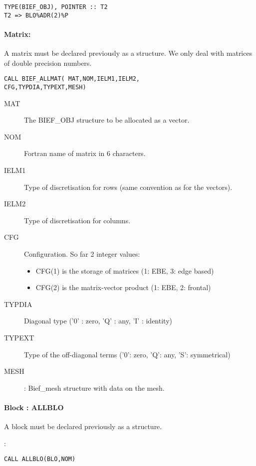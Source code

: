 \begin{lstlisting}[language=TelFortran]
TYPE(BIEF_OBJ), POINTER :: T2
T2 => BLO%ADR(2)%P
\end{lstlisting}

\paragraph{Matrix: }

A matrix must be declared previously as a  structure. We only
deal with matrices of double precision numbers.

\begin{lstlisting}[language=TelFortran]
CALL BIEF_ALLMAT( MAT,NOM,IELM1,IELM2,
CFG,TYPDIA,TYPEXT,MESH)
\end{lstlisting}

\begin{description}
\item [MAT] The BIEF\_OBJ structure to be allocated as a vector.
\item [NOM] Fortran name of matrix in 6 characters.
\item [IELM1] Type of discretisation for rows (same convention as for the
  vectors).
\item [IELM2] Type of discretisation for columns.
\item [CFG] Configuration. So far 2 integer values:
\begin{itemize}
  \item CFG(1) is the storage of matrices (1: EBE, 3: edge based)
  \item CFG(2) is the matrix-vector product (1: EBE, 2: frontal)
\end{itemize}
\item [TYPDIA] Diagonal type ('0' : zero, 'Q' : any, 'I' : identity)
\item [TYPEXT] Type of the off-diagonal terms ('0': zero, 'Q': any, 'S':
  symmetrical)
\item [MESH]  : Bief\_mesh structure with data on the mesh.
\end{description}

\paragraph{Block : ALLBLO}

A block must be declared previously as a  structure.

:
\begin{lstlisting}[language=TelFortran]
CALL ALLBLO(BLO,NOM)
\end{lstlisting}

